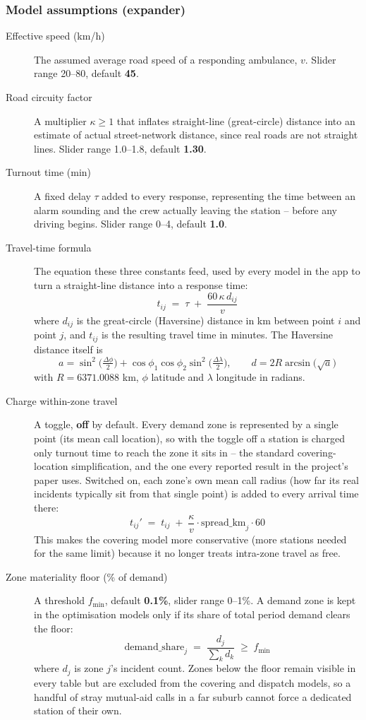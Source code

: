\documentclass[11pt]{article}
\begin{document}
\subsubsection*{Model assumptions (expander)}
\begin{description}
  \item[Effective speed (km/h)] The assumed average road speed of a responding
    ambulance, $v$. Slider range 20--80, default \textbf{45}.
  \item[Road circuity factor] A multiplier $\kappa \geq 1$ that inflates
    straight-line (great-circle) distance into an estimate of actual
    street-network distance, since real roads are not straight lines. Slider
    range 1.0--1.8, default \textbf{1.30}.
  \item[Turnout time (min)] A fixed delay $\tau$ added to every response,
    representing the time between an alarm sounding and the crew actually
    leaving the station -- before any driving begins. Slider range 0--4,
    default \textbf{1.0}.
  \item[Travel-time formula] The equation these three constants feed, used by
    every model in the app to turn a straight-line distance into a response
    time:
    \[
      t_{ij} \;=\; \tau \;+\; \frac{60\,\kappa\, d_{ij}}{v}
    \]
    where $d_{ij}$ is the great-circle (Haversine) distance in km between
    point $i$ and point $j$, and $t_{ij}$ is the resulting travel time in
    minutes. The Haversine distance itself is
    \[
      a = \sin^2\!\Big(\tfrac{\Delta\phi}{2}\Big) + \cos\phi_1\cos\phi_2
          \sin^2\!\Big(\tfrac{\Delta\lambda}{2}\Big), \qquad
      d = 2R\arcsin\!\big(\sqrt{a}\big)
    \]
    with $R = 6371.0088$ km, $\phi$ latitude and $\lambda$ longitude in
    radians.
  \item[Charge within-zone travel] A toggle, \textbf{off} by default. Every
    demand zone is represented by a single point (its mean call location), so
    with the toggle off a station is charged only turnout time to reach the
    zone it sits in -- the standard covering-location simplification, and the
    one every reported result in the project's paper uses. Switched on, each
    zone's own mean call radius (how far its real incidents typically sit from
    that single point) is added to every arrival time there:
    \[
      t_{ij}' \;=\; t_{ij} \;+\; \frac{\kappa}{v}\cdot
        \text{spread\_km}_{j}\cdot 60
    \]
    This makes the covering model more conservative (more stations needed for
    the same limit) because it no longer treats intra-zone travel as free.
  \item[Zone materiality floor (\% of demand)] A threshold $f_{\min}$, default
    \textbf{0.1\%}, slider range 0--1\%. A demand zone is kept in the
    optimisation models only if its share of total period demand clears the
    floor:
    \[
      \text{demand\_share}_j \;=\; \frac{d_j}{\sum_k d_k} \;\geq\; f_{\min}
    \]
    where $d_j$ is zone $j$'s incident count. Zones below the floor remain
    visible in every table but are excluded from the covering and dispatch
    models, so a handful of stray mutual-aid calls in a far suburb cannot
    force a dedicated station of their own.
\end{description}
\end{document}
